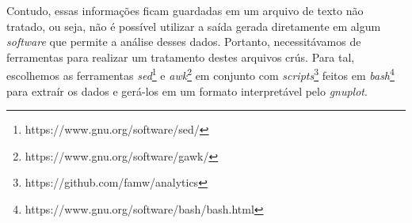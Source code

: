 Contudo, essas informações ficam guardadas em um arquivo de texto não tratado,
ou seja, não é possível utilizar a saída gerada diretamente em algum
\textit{software} que permite a análise desses dados. Portanto, necessitávamos
de ferramentas para realizar um tratamento destes arquivos crús.  Para tal,
escolhemos as ferramentas
\textit{sed}\footnote{https://www.gnu.org/software/sed/} e
\textit{awk}\footnote{https://www.gnu.org/software/gawk/} em conjunto com
\textit{scripts}\footnote{https://github.com/famw/analytics} feitos em
\textit{bash}\footnote{https://www.gnu.org/software/bash/bash.html} para extraír
os dados e gerá-los em um formato interpretável pelo \textit{gnuplot}.
